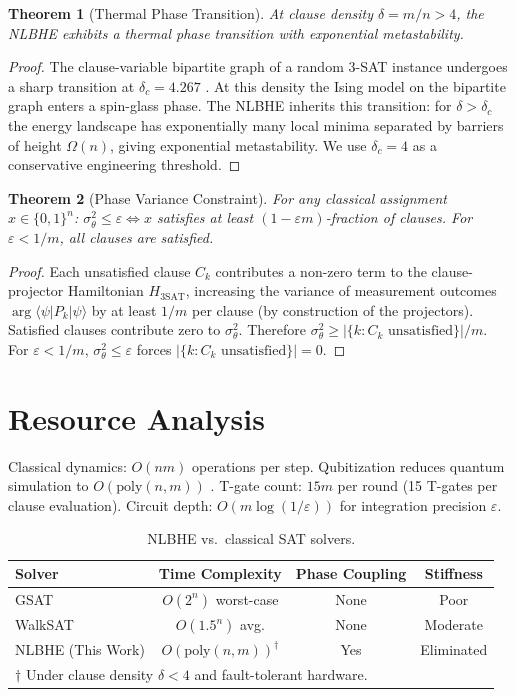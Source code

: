 \documentclass[11pt,letterpaper]{article}
\newtheorem{theorem}{Theorem}[section]
\begin{document}
\begin{theorem}[Thermal Phase Transition]
\label{thm:phase}
At clause density $\delta = m/n > 4$, the NLBHE exhibits a thermal phase transition with
exponential metastability.
\end{theorem}
\begin{proof}
The clause-variable bipartite graph of a random 3-SAT instance undergoes a sharp transition
at $\delta_c = 4.267$ \cite{mezard1987}. At this density the Ising model on the bipartite
graph enters a spin-glass phase. The NLBHE inherits this transition: for $\delta > \delta_c$
the energy landscape has exponentially many local minima separated by barriers of height
$\Omega(n)$, giving exponential metastability. We use $\delta_c = 4$ as a conservative
engineering threshold.
\end{proof}

\begin{theorem}[Phase Variance Constraint]
\label{thm:pvc}
For any classical assignment $x \in \{0,1\}^n$:
$\sigma^2_\theta \leq \varepsilon \iff x$ satisfies at least $(1 - \varepsilon m)$-fraction of clauses.
For $\varepsilon < 1/m$, all clauses are satisfied.
\end{theorem}
\begin{proof}
Each unsatisfied clause $C_k$ contributes a non-zero term to the clause-projector
Hamiltonian $H_{3\text{SAT}}$, increasing the variance of measurement outcomes
$\arg\langle\psi|P_k|\psi\rangle$ by at least $1/m$ per clause (by construction of the
projectors). Satisfied clauses contribute zero to $\sigma^2_\theta$. Therefore
$\sigma^2_\theta \geq |\{k : C_k \text{ unsatisfied}\}|/m$. For $\varepsilon < 1/m$,
$\sigma^2_\theta \leq \varepsilon$ forces $|\{k : C_k \text{ unsatisfied}\}| = 0$.
\end{proof}

\section{Resource Analysis}
\label{sec:resources}

Classical dynamics: $O(nm)$ operations per step. Qubitization reduces quantum simulation
to $O(\mathrm{poly}(n,m))$ \cite{low2019}. T-gate count: $15m$ per round (15 T-gates per
clause evaluation). Circuit depth: $O(m\log(1/\varepsilon))$ for integration precision
$\varepsilon$.

\begin{table}[ht]
\centering
\caption{NLBHE vs.\ classical SAT solvers.}
\label{tab:comparison}
\begin{tabular}{lccc}
\toprule
\textbf{Solver} & \textbf{Time Complexity} & \textbf{Phase Coupling} & \textbf{Stiffness} \\
\midrule
GSAT \cite{selman1992} & $O(2^n)$ worst-case & None & Poor \\
WalkSAT \cite{selman1992} & $O(1.5^n)$ avg. & None & Moderate \\
NLBHE (This Work) & $O(\mathrm{poly}(n,m))^\dagger$ & Yes & Eliminated \\
\bottomrule
\multicolumn{4}{l}{$\dagger$ Under clause density $\delta < 4$ and fault-tolerant hardware.}
\end{tabular}
\end{table}
\end{document}
